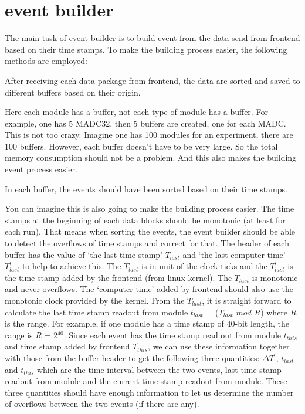 \documentclass[a4paper,12pt]{article}
\begin{document}
	\section{event builder}
	The main task of event builder is to build event from the data send from
	frontend based on their time stamps. To make the building process
	easier, the following methods are employed:
	 \begin{tcolorbox}
		 After receiving each data package from frontend, the data are
		 sorted and saved to different buffers based on their origin. 
	 \end{tcolorbox}
	 Here each module has a buffer, not each type of module has a buffer.
	 For example, one has 5 MADC32, then 5 buffers are created, one for each
	 MADC. This is not too crazy. Imagine one has 100 modules for an
	 experiment, there are 100 buffers. However, each buffer doesn't have to
	 be very large. So the total memory consumption should not be a problem.
	 And this also makes the building event process easier.
	 \begin{tcolorbox}
		 In each buffer, the events should have been sorted based on their
		 time stamps.
	 \end{tcolorbox}
	 You can imagine this is also going to make the building process easier.
	 The time stamps at the beginning of each data blocks should be
	 monotonic (at least for each run). That means when sorting the events,
	 the event builder should be able to detect the overflows of time
	 stamps and correct for that. The header of each buffer has the value of
	 `the last time stamp' $T_{last}$ and `the last computer time'
	 $T^\prime_{last}$ to help to achieve
	 this. The $T_{last}$ is in unit of the clock ticks and the
	 $T^\prime_{last}$
	 is the time stamp added by the frontend (from linux kernel). The $T_{last}$
     is monotonic and never overflows. 
	 The
	 `computer time' added by frontend should also use the monotonic clock
	 provided by the kernel. 
	 From the $T_{last}$, it is straight forward to calculate the last
	 time stamp readout from module $t_{last}$ = ($T_{last}$ $ mod$ $ R$)
	 where $R$ is the range. For example, if one module has a time stamp of
	 40-bit length, the range is $R$ = 2$^{40}$.  Since each event has the
	 time stamp read out from module $t_{this}$ and time stamp added by
	 frontend $T^\prime_{this}$, we can use these information together with
	 those from the buffer header to get the following three quantities:
	 $\Delta T^\prime$, $t_{last}$ and $t_{this}$ which are the time interval
	 between the two events, last time stamp readout from module and the
	 current time stamp readout from module. These three quantities should
	 have enough information to let us determine the number of overflows
	 between the two events (if there are any).
\end{document}
